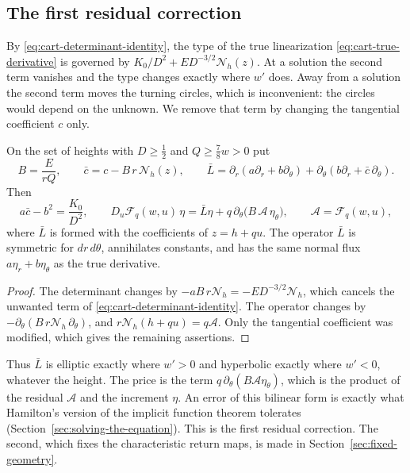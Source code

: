\subsection{The first residual correction}
\label{subsec:first-correction}

By \eqref{eq:cart-determinant-identity}, the type of the true
linearization \eqref{eq:cart-true-derivative} is governed by
$K_0/D^2+ED^{-3/2}\mathcal N_h(z)$. At a solution the second term
vanishes and the type changes exactly where $w'$ does. Away from a
solution the second term moves the turning circles, which is
inconvenient: the circles would depend on the unknown. We remove that
term by changing the tangential coefficient $c$ only.

\begin{lemma}\label{lem:type-completion}
On the set of heights with $D\ge\tfrac12$ and $Q\ge\tfrac78w>0$ put
\[
 B=\frac{E}{rQ},\qquad \bar c=c-B\,r\,\mathcal N_h(z),\qquad
 \bar L=\partial_r(a\partial_r+b\partial_\theta)
             +\partial_\theta(b\partial_r+\bar c\,\partial_\theta).
\]
Then
\begin{equation}\label{eq:cart-completed-normalized-derivative}
 a\bar c-b^2=\frac{K_0}{D^2},\qquad
 D_u\mathcal F_q(w,u)\,\eta=\bar L\eta
       +q\,\partial_\theta\bigl(B\,\mathcal A\,\eta_\theta\bigr),
 \qquad \mathcal A=\mathcal F_q(w,u),
\end{equation}
where $\bar L$ is formed with the coefficients of $z=h+qu$. The
operator $\bar L$ is symmetric for $dr\,d\theta$, annihilates
constants, and has the same normal flux $a\eta_r+b\eta_\theta$ as the
true derivative.
\end{lemma}

\begin{proof}
The determinant changes by $-aB\,r\mathcal N_h=-ED^{-3/2}\mathcal N_h$,
which cancels the unwanted term of
\eqref{eq:cart-determinant-identity}. The operator changes by
$-\partial_\theta(B\,r\mathcal N_h\,\partial_\theta)$, and
$r\mathcal N_h(h+qu)=q\mathcal A$. Only the tangential coefficient was
modified, which gives the remaining assertions.
\end{proof}

Thus $\bar L$ is elliptic exactly where $w'>0$ and hyperbolic exactly
where $w'<0$, whatever the height. The price is the term
$q\,\partial_\theta(B\mathcal A\eta_\theta)$, which is the product of
the residual $\mathcal A$ and the increment $\eta$. An error of this
bilinear form is exactly what Hamilton's version of the implicit
function theorem tolerates (Section~\ref{sec:solving-the-equation}).
This is the first residual correction. The second, which fixes the
characteristic return maps, is made in
Section~\ref{sec:fixed-geometry}.

